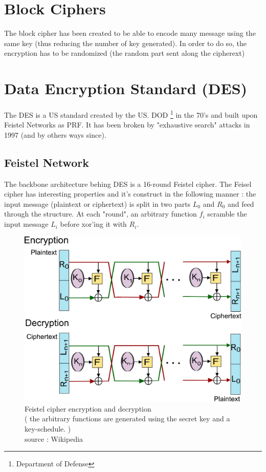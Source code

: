 \section{ Block Ciphers }


The block cipher has been created to be able to encode many message using the same key (thus reducing the number of key generated). In order to do so, the encryption has to be randomized (the random part sent along the cipherext)

\section{Data Encryption Standard (DES)}

The DES is a US standard created by the US. DOD \footnote{Department of Defense} in the 70's and built upon Feistel Networks as PRF. It has been broken by "exhaustive search" attacks in 1997 (and by others ways since).

\subsection{Feistel Network}

The backbone architecture behing DES is a 16-round Feistel cipher. The Feisel cipher has interesting properties and it's construct in the following manner : the input message (plaintext or ciphertext) is split in two parts $L_0$ and $R_0$ and feed through the structure. At each "round", an arbitrary function $f_i$ scramble the input message $L_i$ before xor'ing it with $R_i$.

\begin{figure}[ht!]
    \centering
       \includegraphics[width=\textwidth]{images/Feistel_cipher_encryption.pdf}
    \caption{Feistel cipher encryption and decryption \\ ( the arbitrary functions are generated using the secret key and a key-schedule. )\\ source : Wikipedia}
	\label{fig:Feistel_cipher}
\end{figure}
 

